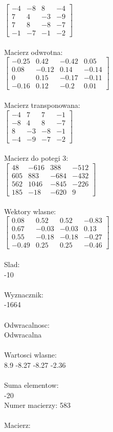 \documentclass[a4paper,12pt]{article}
\begin{document}
$\begin{bmatrix} -4&-8&8&-4\\7&4&-3&-9\\7&8&-8&-7\\-1&-7&-1&-2 \end{bmatrix}$
\\
\\
Macierz odwrotna:\\

$\begin{bmatrix} -0.25&0.42&-0.42&0.05\\0.08&-0.12&0.14&-0.14\\0&0.15&-0.17&-0.11\\-0.16&0.12&-0.2&0.01 \end{bmatrix}$
\\
\\
Macierz transponowana:\\

$\begin{bmatrix} -4&7&7&-1\\-8&4&8&-7\\8&-3&-8&-1\\-4&-9&-7&-2 \end{bmatrix}$
\\
\\
Macierz do potegi 3:\\

$\begin{bmatrix} 48&-616&388&-512\\605&883&-684&-432\\562&1046&-845&-226\\185&-18&-620&9 \end{bmatrix}$
\\
\\
Wektory wlasne:\\

$\begin{bmatrix} 0.08&0.52&0.52&-0.83\\0.67&-0.03&-0.03&0.13\\0.55&-0.18&-0.18&-0.27\\-0.49&0.25&0.25&-0.46 \end{bmatrix}$
\\
\\
Slad:\\
-10
\\
\\
Wyznacznik:\\
-1664
\\
\\
Odwracalnosc:\\
Odwracalna
\\
\\
Wartosci wlasne:\\
8.9 -8.27 -8.27 -2.36
\\
\\
Suma elementow:\\
-20
\\
\newpage
Numer macierzy:
583
\\
\\
Macierz:\\
\end{document}
